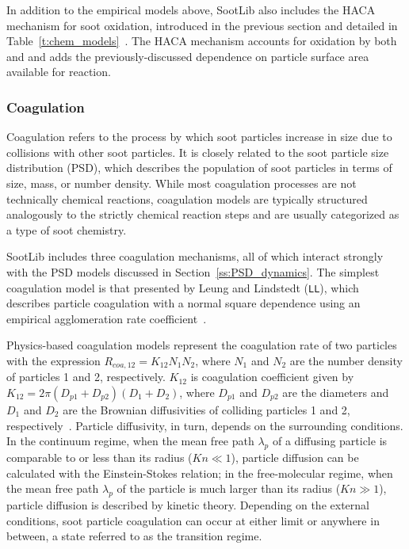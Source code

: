 \documentclass[preprint,letterpaper]{elsarticle}
\begin{document}
In addition to the empirical models above, SootLib also includes the HACA mechanism for soot oxidation, introduced in the previous section and detailed in Table~\ref{t:chem_models}~\cite{Appel_2000}. The HACA mechanism accounts for oxidation by both  and  and adds the previously-discussed dependence on particle surface area available for reaction.

\subsubsection{Coagulation}
\label{sss:coa}

Coagulation refers to the process by which soot particles increase in size due to collisions with other soot particles. It is closely related to the soot particle size distribution (PSD), which describes the population of soot particles in terms of size, mass, or number density. While most coagulation processes are not technically chemical reactions, coagulation models are typically structured analogously to the strictly chemical reaction steps and are usually categorized as a type of soot chemistry.

SootLib includes three coagulation mechanisms, all of which interact strongly with the PSD models discussed in Section~\ref{ss:PSD_dynamics}. The simplest coagulation model is that presented by Leung and Lindstedt (\texttt{LL}), which describes particle coagulation with a normal square dependence using an empirical agglomeration rate coefficient~\cite{Leung_1991}.

Physics-based coagulation models represent the coagulation rate of two particles with the expression $R_{coa,12}=K_{12}N_1N_2$, where $N_1$ and $N_2$ are the number density of particles 1 and 2, respectively. $K_{12}$ is coagulation coefficient given by $K_{12}=2\pi (D_{p1}+D_{p2})(D_1+D_2)$, where $D_{p1}$ and $D_{p2}$ are the diameters and $D_1$ and $D_2$ are the Brownian diffusivities of colliding particles 1 and 2, respectively~\cite{Seinfeld_2016}. Particle diffusivity, in turn, depends on the surrounding conditions. In the continuum regime, when the mean free path $\lambda_p$ of a diffusing particle is comparable to or less than its radius ($Kn\ll1$), particle diffusion can be calculated with the Einstein-Stokes relation; in the free-molecular regime, when the mean free path $\lambda_p$ of the particle is much larger than its radius ($Kn\gg1$), particle diffusion is described by kinetic theory. Depending on the external conditions, soot particle coagulation can occur at either limit or anywhere in between, a state referred to as the transition regime.
\end{document}
